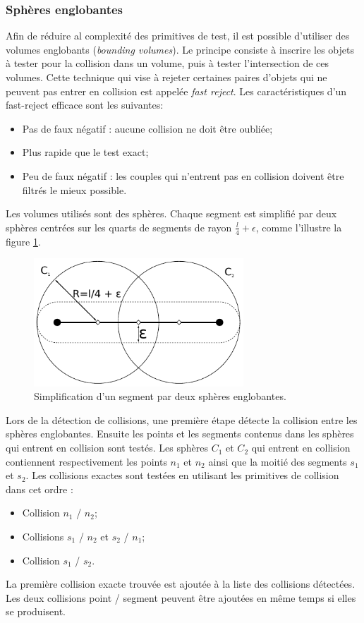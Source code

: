 \documentclass[11pt,class=article,float=false,crop=false]{standalone}
\begin{document}
\subsubsection{Sphères englobantes}
\label{sec:spheres_englobantes}
Afin de réduire al complexité des primitives de test, il est possible d'utiliser des volumes englobants (\textit{bounding volumes}). Le principe consiste à inscrire les objets à tester pour la collision dans un volume, puis à tester l'intersection de ces volumes. Cette technique qui vise à rejeter certaines paires d'objets qui ne peuvent pas entrer en collision est appelée \textit{fast reject}. Les caractéristiques d'un fast-reject efficace sont les suivantes:
\begin{itemize}
	\item Pas de faux négatif : aucune collision ne doit être oubliée;
	\item Plus rapide que le test exact;
	\item Peu de faux négatif : les couples qui n'entrent pas en collision doivent être filtrés le mieux possible.
\end{itemize}

Les volumes utilisés sont des sphères. Chaque segment est simplifié par deux sphères centrées sur les quarts de segments de rayon $\frac{l}{4} + \epsilon$, comme l'illustre la figure \ref{fig:fastreject-segment}.

\begin{figure}[H]
	\centering
	\includegraphics[width=0.7\textwidth]{img/fastreject-segment}
	\caption{Simplification d'un segment par deux sphères englobantes.}
	\label{fig:fastreject-segment}
\end{figure}

Lors de la détection de collisions, une première étape détecte la collision entre les sphères englobantes. Ensuite 
les points et les segments contenus dans les sphères qui entrent en collision sont testés. Les sphères $C_1$ et $C_2$ qui entrent en collision contiennent respectivement les points $n_1$ et $n_2$ ainsi que la moitié des segments $s_1$ et $s_2$. Les collisions exactes sont testées en utilisant les primitives de collision dans cet ordre :
\begin{itemize}
	\item Collision $n_1$ / $n_2$;
	\item Collisions $s_1$ / $n_2$ et $s_2$ / $n_1$;
	\item Collision $s_1$ / $s_2$.
\end{itemize}
La première collision exacte trouvée est ajoutée à la liste des collisions détectées. Les deux collisions point / segment peuvent être ajoutées en même temps si elles se produisent.
\end{document}
